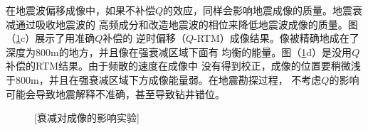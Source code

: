 在地震波偏移成像中，如果不补偿$Q$的效应，同样会影响地震成像的质量。地震衰减通过吸收地震波的
高频成分和改造地震波的相位来降低地震波成像的质量。图（\ref{fig:qrtm}c）展示了用准确$Q$补偿的
逆时偏移（$Q$-RTM）成像结果。像被精确地成在了深度为800m的地方，并且像在强衰减区域下面有
均衡的能量。图（\ref{fig:qrtm}d）是没用$Q$补偿的RTM结果。由于频散的速度在成像中
没有得到校正，成像的位置要稍微浅于800m，并且在强衰减区域下方成像能量弱。在地震勘探过程，
不考虑$Q$的影响可能会导致地震解释不准确，甚至导致钻井错位。

\begin{figure}[!htbp]
        \centering
		[衰减对成像的影响实验]
        \label{fig:qrtm}
\end{figure}

